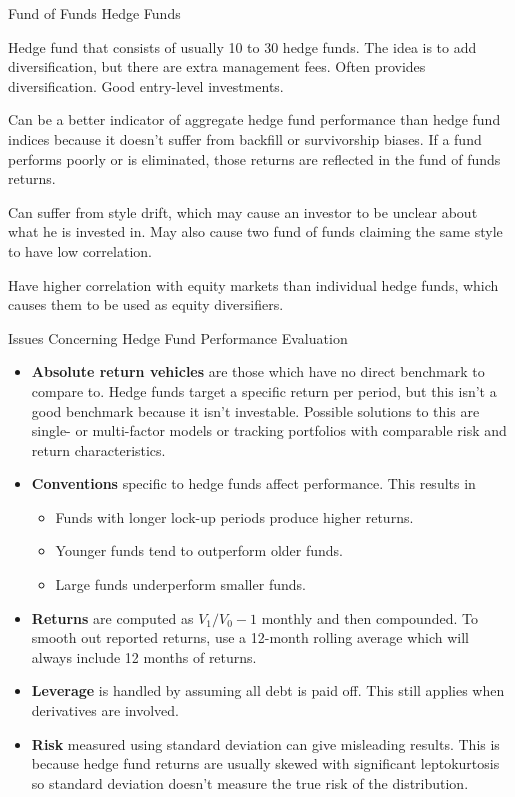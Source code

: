 \documentclass[../custom,grid]{flashcards}
\begin{document}
\begin{flashcard}{Fund of Funds Hedge Funds}
    \begin{flushleft}
        Hedge fund that consists of usually 10 to 30 hedge funds. The idea is to add diversification, but there are extra management fees. Often provides diversification. Good entry-level investments.\newline

        Can be a better indicator of aggregate hedge fund performance than hedge fund indices because it doesn't suffer from backfill or survivorship biases. If a fund performs poorly or is eliminated, those returns are reflected in the fund of funds returns.\newline

        Can suffer from style drift, which may cause an investor to be unclear about what he is invested in. May also cause two fund of funds claiming the same style to have low correlation.\newline

        Have higher correlation with equity markets than individual hedge funds, which causes them to be used as equity diversifiers.
    \end{flushleft}
\end{flashcard}

\begin{flashcard}{Issues Concerning Hedge Fund Performance Evaluation}
    \begin{itemize}
        \item \textbf{Absolute return vehicles} are those which have no direct benchmark to compare to. Hedge funds target a specific return per period, but this isn't a good benchmark because it isn't investable. Possible solutions to this are single- or multi-factor models or tracking portfolios with comparable risk and return characteristics.
        \item \textbf{Conventions} specific to hedge funds affect performance. This results in
        \begin{itemize}
            \item Funds with longer lock-up periods produce higher returns.
            \item Younger funds tend to outperform older funds.
            \item Large funds underperform smaller funds.
        \end{itemize}
        \item \textbf{Returns} are computed as $V_1 / V_0 - 1$ monthly and then compounded. To smooth out reported returns, use a 12-month rolling average which will always include 12 months of returns.
        \item \textbf{Leverage} is handled by assuming all debt is paid off. This still applies when derivatives are involved. 
        \item \textbf{Risk} measured using standard deviation can give misleading results. This is because hedge fund returns are usually skewed with significant leptokurtosis so standard deviation doesn't measure the true risk of the distribution.
    \end{itemize}
\end{flashcard}
\end{document}
